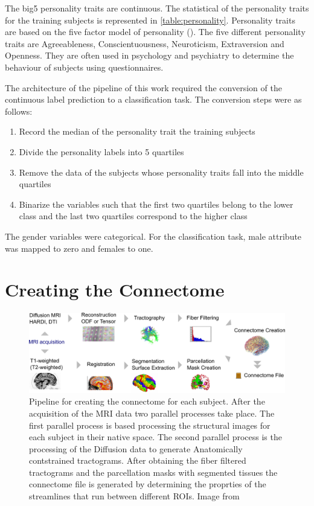 \documentclass[msthesis.tex]{subfiles}
\begin{document}
The big5 personality traits are continuous. The statistical of the personality traits for the training subjects is represented in \autoref{table:personality}. Personality traits are based on the five factor model of personality (\cite{costa1992five}). The five different personality traits are Agreeableness, Conscientuousness, Neuroticism, Extraversion and Openness. They are often used in psychology and psychiatry to determine the behaviour of subjects using questionnaires. 

The architecture of the pipeline of this work required the conversion of the continuous label prediction to a classification task. The conversion steps were as follows:
\begin{enumerate}
\item Record the median of the personality trait the training subjects
\item Divide the personality labels into 5 quartiles
 \item Remove the data of the subjects whose personality traits fall into the middle quartiles
 \item Binarize the variables such that the first two quartiles belong to the lower class and the last two quartiles correspond to the higher class
\end{enumerate}

The gender variables were categorical. For the classification task, male attribute was mapped to zero and females to one.


\section{Creating the Connectome}
\label{sec:creating_connectome}
\begin{figure}
    \centering
    \includegraphics[width=\textwidth]{images/connectome_creation_workflow.png}
    \caption{Pipeline for creating the connectome for each subject. After the acquisition of the MRI data two parallel processes take place. The first parallel process is based processing the structural images for each subject in their native space. The second parallel process is the processing of the Diffusion data to generate Anatomically contstrained tractograms. After obtaining the fiber filtered tractograms and the parcellation masks with segmented tissues the connectome file is generated by determining the proprties of the streamlines that run between different ROIs. Image from \cite{gerhard2011connectome}}
    \label{fig:connectome_pipeline}
\end{figure}
\end{document}
